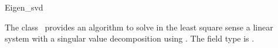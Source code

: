 \begin{ccRefClass}{Eigen_svd}

\ccDefinition
  
The class \ccRefName\ provides an algorithm to solve in the least
square sense a linear system with a singular value decomposition using
. The field type is .


\ccIsModel
{}

\end{ccRefClass}


